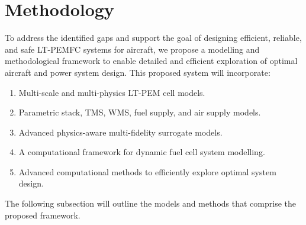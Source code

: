 \section{Methodology} \label{sec:method}

To address the identified gaps and support the goal of designing efficient, reliable, and safe LT-PEMFC systems for aircraft, we propose a modelling and methodological framework to enable detailed and efficient exploration of optimal aircraft and power system design. This proposed system will incorporate:
\begin{enumerate}
	\item Multi-scale and multi-physics LT-PEM cell models.
	\item Parametric stack, TMS, WMS, fuel supply, and air supply models.
	\item Advanced physics-aware multi-fidelity surrogate models.
	\item A computational framework for dynamic fuel cell system modelling.
	\item Advanced computational methods to efficiently explore optimal system design.
\end{enumerate}
The following subsection will outline the models and methods that comprise the proposed framework.

